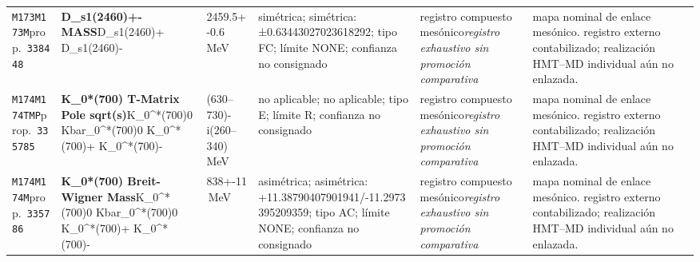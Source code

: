 \begin{landscape}
\begin{longtable}{L{1.85cm}L{4.45cm}L{2.35cm}L{4.05cm}L{3.35cm}L{7.15cm}}
\texttt{M173}\newline \texttt{M173M}\newline prop.\ \texttt{338448} & \textbf{D\_\allowbreak{}s1(2460)+- MASS}\newline D\_\allowbreak{}s1(2460)+ \textbar{}\allowbreak{} D\_\allowbreak{}s1(2460)- & 2459.5+-0.6\,MeV & simétrica; simétrica: ±0.63443027023618292; tipo FC; límite NONE; confianza no consignado & registro compuesto mesónico\newline \emph{registro exhaustivo sin promoción comparativa} & mapa nominal de enlace mesónico. registro externo contabilizado; realización HMT--MD individual aún no enlazada. \\
\texttt{M174}\newline \texttt{M174TMP}\newline prop.\ \texttt{335785} & \textbf{K\_\allowbreak{}0*(700) T-Matrix Pole sqrt(s)}\newline K\_\allowbreak{}0\textasciicircum{}*(700)0 \textbar{}\allowbreak{} Kbar\_\allowbreak{}0\textasciicircum{}*(700)0 \textbar{}\allowbreak{} K\_\allowbreak{}0\textasciicircum{}*(700)+ \textbar{}\allowbreak{} K\_\allowbreak{}0\textasciicircum{}*(700)- & (630--730)-i(260--340)\,MeV & no aplicable; no aplicable; tipo E; límite R; confianza no consignado & registro compuesto mesónico\newline \emph{registro exhaustivo sin promoción comparativa} & mapa nominal de enlace mesónico. registro externo contabilizado; realización HMT--MD individual aún no enlazada. \\
\texttt{M174}\newline \texttt{M174M}\newline prop.\ \texttt{335786} & \textbf{K\_\allowbreak{}0*(700) Breit-Wigner Mass}\newline K\_\allowbreak{}0\textasciicircum{}*(700)0 \textbar{}\allowbreak{} Kbar\_\allowbreak{}0\textasciicircum{}*(700)0 \textbar{}\allowbreak{} K\_\allowbreak{}0\textasciicircum{}*(700)+ \textbar{}\allowbreak{} K\_\allowbreak{}0\textasciicircum{}*(700)- & 838+-11\,MeV & asimétrica; asimétrica: +11.38790407901941/-11.2973395209359; tipo AC; límite NONE; confianza no consignado & registro compuesto mesónico\newline \emph{registro exhaustivo sin promoción comparativa} & mapa nominal de enlace mesónico. registro externo contabilizado; realización HMT--MD individual aún no enlazada. \\

\end{longtable}
\end{landscape}
